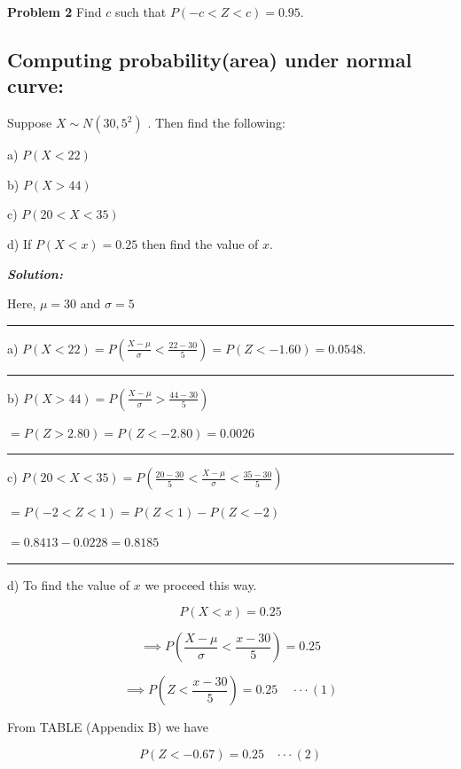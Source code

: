 \documentclass[
  11pt,
  letterpaper,
  DIV=11,
  numbers=noendperiod]{scrreprt}
\begin{document}
\textbf{Problem 2} Find \(c\) such that \(P(-c<Z<c)=0.95\).

\subsection{Computing probability(area) under normal
curve:}\label{computing-probabilityarea-under-normal-curve}

Suppose \(X\sim N(30, 5^2)\) . Then find the following:

a) \(P(X<22)\)

b) \(P(X>44)\)

c) \(P(20<X<35)\)

d) If \(P(X<x)=0.25\) then find the value of \(x\).

\textbf{\emph{Solution:}}

Here, \(\mu=30\) and \(\sigma=5\)

\begin{center}\rule{0.5\linewidth}{0.5pt}\end{center}

a)
\(P(X<22)=P(\frac{X-\mu}{\sigma}<\frac{22-30}{5})=P(Z<-1.60)=0.0548\).

\begin{center}\rule{0.5\linewidth}{0.5pt}\end{center}

b) \(P(X>44)=P(\frac{X-\mu}{\sigma}>\frac{44-30}{5})\)

\(=P(Z>2.80)=P(Z<-2.80)=0.0026\)

\begin{center}\rule{0.5\linewidth}{0.5pt}\end{center}

c)
\(P(20<X<35)=P(\frac{20-30}{5}<\frac{X-\mu}{\sigma}<\frac{35-30}{5})\)

\(=P(-2<Z<1)=P(Z<1)-P(Z<-2)\)

\(=0.8413-0.0228=0.8185\)

\begin{center}\rule{0.5\linewidth}{0.5pt}\end{center}

d) To find the value of \(x\) we proceed this way.

\[P(X<x)=0.25\]

\[\implies P(\frac{X-\mu}{\sigma}<\frac{x-30}{5})=0.25\]

\[\implies P(Z<\frac{x-30}{5})=0.25 \ \ \ \ \ \cdot \cdot \cdot (1)\]

From TABLE (Appendix B) we have

\[P(Z<-0.67)=0.25  \ \ \ \ \cdot \cdot \cdot (2)\]
\end{document}
